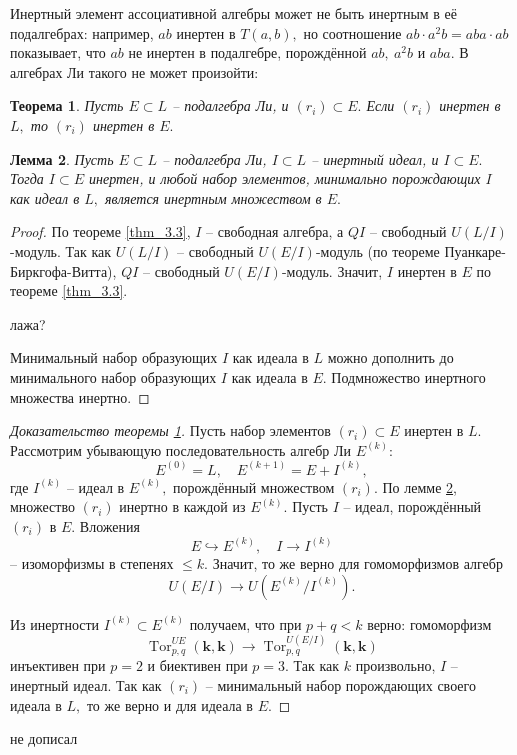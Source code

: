 \documentclass[10pt,a4paper]{article}
\DeclareMathOperator{\Tor}{Tor}
\def\k{\mathbf{k}}
\newtheorem{thm}{Теорема}[section]
\newtheorem{lmm}[thm]{Лемма}
\theoremstyle{definition}
\begin{document}
Инертный элемент ассоциативной алгебры может не быть инертным в её подалгебрах: например, $ab$ инертен в $T(a,b),$ но соотношение $ab\cdot a^2b=aba\cdot ab$ показывает, что $ab$ не инертен в подалгебре, порождённой $ab,~a^2b$ и $aba.$ В алгебрах Ли такого не может произойти:
\begin{thm}\label{thm_3.8}
Пусть $E\subset L$ -- подалгебра Ли, и $(r_i)\subset E.$ Если $(r_i)$ инертен в $L,$ то $(r_i)$ инертен в $E.$
\end{thm}
\begin{lmm}\label{lmm_3.9}
Пусть $E\subset L$ -- подалгебра Ли, $I\subset L$ -- инертный идеал, и $I\subset E.$ Тогда $I\subset E$ инертен, и любой набор элементов, минимально порождающих $I$ как идеал в $L,$ является инертным множеством в $E.$
\end{lmm}
\begin{proof}
По теореме \ref{thm_3.3}, $I$ -- свободная алгебра, а $QI$ -- свободный $U(L/I)$-модуль. Так как $U(L/I)$ -- свободный $U(E/I)$-модуль (по теореме Пуанкаре-Биркгофа-Витта), $QI$ -- свободный $U(E/I)$-модуль. Значит, $I$ инертен в $E$ по теореме \ref{thm_3.3}.

{\color{red} лажа?}

Минимальный набор образующих $I$ как идеала в $L$ можно дополнить до минимального набор образующих $I$ как идеала в $E.$ Подмножество инертного множества инертно.
\end{proof}

\begin{proof}[Доказательство теоремы \ref{thm_3.8}] Пусть набор элементов $(r_i)\subset E$ инертен в $L.$ Рассмотрим убывающую последовательность алгебр Ли $E^{(k)}:$
$$E^{(0)}=L,\quad E^{(k+1)}=E+I^{(k)},$$ где $I^{(k)}$ -- идеал в $E^{(k)},$ порождённый множеством $(r_i).$ По лемме \ref{lmm_3.9}, множество $(r_i)$ инертно в каждой из $E^{(k)}.$ Пусть $I$ -- идеал, порождённый $(r_i)$ в $E.$ Вложения
$$E\hookrightarrow E^{(k)},\quad I\to I^{(k)}$$ -- изоморфизмы в степенях $\le k.$ Значит, то же верно для гомоморфизмов алгебр
$$U(E/I)\to U(E^{(k)}/I^{(k)}).$$

Из инертности $I^{(k)}\subset E^{(k)}$ получаем, что при $p+q<k$ верно: гомоморфизм
$$\Tor_{p,q}^{UE}(\k,\k)\to \Tor_{p,q}^{U(E/I)}(\k,\k)$$ инъективен при $p=2$ и биективен при $p=3.$ Так как $k$ произвольно, $I$ -- инертный идеал. Так как $(r_i)$ -- минимальный набор порождающих своего идеала в $L,$ то же верно и для идеала в $E.$ 
\end{proof}
{\color{red} не дописал}
\end{document}

